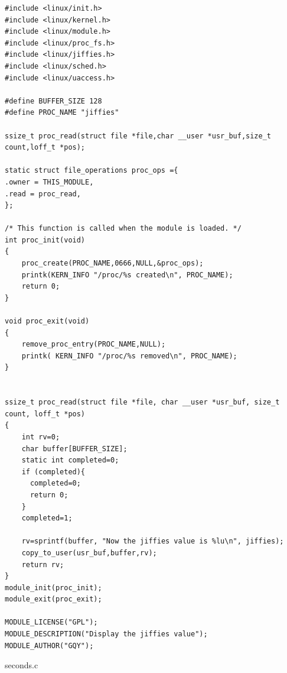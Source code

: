 \documentclass{article}
\begin{document}
\begin{lstlisting}[language={[ANSI]C}]
#include <linux/init.h>
#include <linux/kernel.h>
#include <linux/module.h>
#include <linux/proc_fs.h>
#include <linux/jiffies.h>
#include <linux/sched.h>
#include <linux/uaccess.h>

#define BUFFER_SIZE 128
#define PROC_NAME "jiffies"

ssize_t proc_read(struct file *file,char __user *usr_buf,size_t count,loff_t *pos);

static struct file_operations proc_ops ={
.owner = THIS_MODULE, 
.read = proc_read,  
};

/* This function is called when the module is loaded. */
int proc_init(void)
{
    proc_create(PROC_NAME,0666,NULL,&proc_ops); 
    printk(KERN_INFO "/proc/%s created\n", PROC_NAME);
    return 0;
}

void proc_exit(void)
{
    remove_proc_entry(PROC_NAME,NULL);  
    printk( KERN_INFO "/proc/%s removed\n", PROC_NAME);
}


ssize_t proc_read(struct file *file, char __user *usr_buf, size_t count, loff_t *pos)
{
    int rv=0;  
    char buffer[BUFFER_SIZE];  
    static int completed=0;
    if (completed){
      completed=0;
      return 0;
    }
    completed=1;
     
    rv=sprintf(buffer, "Now the jiffies value is %lu\n", jiffies); 
    copy_to_user(usr_buf,buffer,rv);
    return rv;
}
module_init(proc_init);
module_exit(proc_exit);

MODULE_LICENSE("GPL");
MODULE_DESCRIPTION("Display the jiffies value"); 
MODULE_AUTHOR("GQY"); 

\end{lstlisting}
\begin{center}
{\ttfamily seconds.c}
\end{center}
\end{document}
